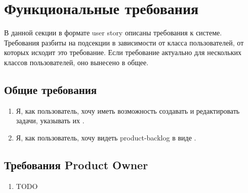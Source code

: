 \documentclass{article}
\begin{document}
\section{Функциональные требования}

В данной секции в формате user story описаны требования к системе.
Требования разбиты на подсекции в зависимости от класса пользователей,
от которых исходит это требование.
Если требование актуально для нескольких классов пользователей, оно
вынесено в общее.

\subsection{Общие требования}
\begin{enumerate}[label=\textbf{FR\arabic*}.]
  \item Я, как пользователь, хочу иметь возможность создавать и редактировать 
    задачи, указывать их .
  \item Я, как пользователь, хочу видеть \Gls{product-backlog} в виде .
\end{enumerate}

\subsection{Требования Product Owner}
\begin{enumerate}[label=\textbf{POR\arabic*}.]
  \item TODO
\end{enumerate}

\printnoidxglossaries
\end{document}
